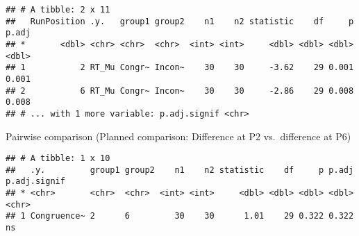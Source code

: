 \documentclass[
]{article}
\newenvironment{Shaded}{\begin{snugshade}}{\end{snugshade}}
\newcommand{\CommentTok}[1]{\textcolor[rgb]{0.56,0.35,0.01}{\textit{#1}}}
\newcommand{\DataTypeTok}[1]{\textcolor[rgb]{0.13,0.29,0.53}{#1}}
\newcommand{\DecValTok}[1]{\textcolor[rgb]{0.00,0.00,0.81}{#1}}
\newcommand{\FloatTok}[1]{\textcolor[rgb]{0.00,0.00,0.81}{#1}}
\newcommand{\KeywordTok}[1]{\textcolor[rgb]{0.13,0.29,0.53}{\textbf{#1}}}
\newcommand{\NormalTok}[1]{#1}
\newcommand{\OperatorTok}[1]{\textcolor[rgb]{0.81,0.36,0.00}{\textbf{#1}}}
\newcommand{\OtherTok}[1]{\textcolor[rgb]{0.56,0.35,0.01}{#1}}
\newcommand{\StringTok}[1]{\textcolor[rgb]{0.31,0.60,0.02}{#1}}
\begin{document}
\begin{Shaded}
\end{Shaded}

\begin{verbatim}
## # A tibble: 2 x 11
##   RunPosition .y.   group1 group2    n1    n2 statistic    df     p p.adj
## *       <dbl> <chr> <chr>  <chr>  <int> <int>     <dbl> <dbl> <dbl> <dbl>
## 1           2 RT_Mu Congr~ Incon~    30    30     -3.62    29 0.001 0.001
## 2           6 RT_Mu Congr~ Incon~    30    30     -2.86    29 0.008 0.008
## # ... with 1 more variable: p.adj.signif <chr>
\end{verbatim}

Pairwise comparison (Planned comparison: Difference at P2 vs.~difference
at P6)

\begin{Shaded}
\end{Shaded}

\begin{verbatim}
## # A tibble: 1 x 10
##   .y.         group1 group2    n1    n2 statistic    df     p p.adj p.adj.signif
## * <chr>       <chr>  <chr>  <int> <int>     <dbl> <dbl> <dbl> <dbl> <chr>       
## 1 Congruence~ 2      6         30    30      1.01    29 0.322 0.322 ns
\end{verbatim}
\end{document}
